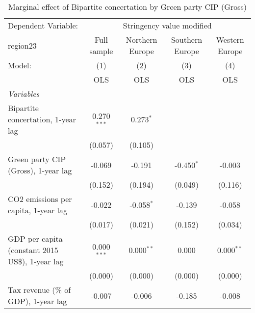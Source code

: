 
\begin{table}[htbp]
   \caption{Marginal effect of Bipartite concertation by Green party CIP (Gross)}
   \centering
   \begin{tabular}{lcccc}
      \toprule
      Dependent Variable: & \multicolumn{4}{c}{Stringency value modified}\\
      region23                                                                 & Full sample   & Northern Europe & Southern Europe & Western Europe \\   
      Model:                                                                   & (1)           & (2)             & (3)             & (4)\\  
                                                                               &  OLS          & OLS             & OLS             & OLS\\  
      \midrule
      \emph{Variables}\\
      Bipartite concertation, 1-year lag                                       & 0.270$^{***}$ & 0.273$^{*}$     &                 &   \\   
                                                                               & (0.057)       & (0.105)         &                 &   \\   
      Green party CIP (Gross), 1-year lag                                      & -0.069        & -0.191          & -0.450$^{*}$    & -0.003\\   
                                                                               & (0.152)       & (0.194)         & (0.049)         & (0.116)\\   
      CO2 emissions per capita, 1-year lag                                     & -0.022        & -0.058$^{*}$    & -0.139          & -0.058\\   
                                                                               & (0.017)       & (0.021)         & (0.152)         & (0.034)\\   
      GDP per capita (constant 2015 US\$), 1-year lag                          & 0.000$^{***}$ & 0.000$^{**}$    & 0.000           & 0.000$^{**}$\\   
                                                                               & (0.000)       & (0.000)         & (0.000)         & (0.000)\\   
      Tax revenue (\% of GDP), 1-year lag                                      & -0.007        & -0.006          & -0.185          & -0.008\\   

\end{tabular}
\end{table}
